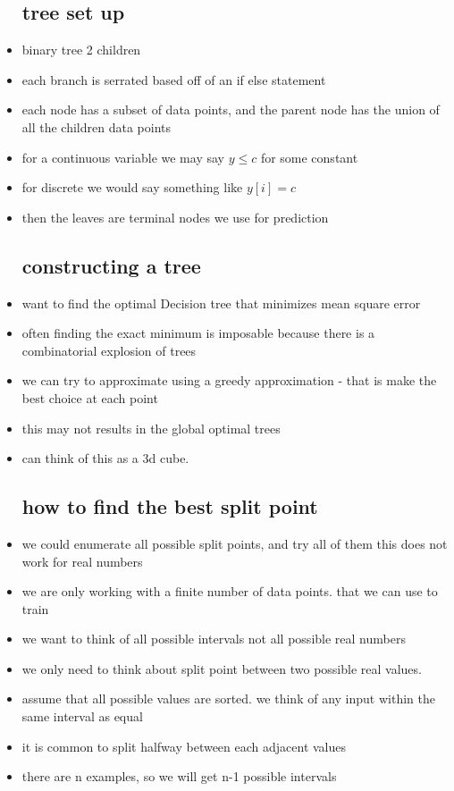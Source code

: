 \documentclass{article}
\begin{document}
\begin{itemize}
\subsection*{tree set up}
\item binary tree 2 children 
\item each branch is serrated based off of an if else statement 
\item each node has a subset of data points, and the parent node has the union of all the children data points 
\item for a continuous variable we may say $y\leq c$ for some constant 
\item for discrete we would say something like $y[i]=c$
\item then the leaves are terminal nodes we use for prediction 
\subsection*{constructing a tree }
\item  want to find the optimal Decision tree that minimizes mean square error 
\item often finding the exact minimum is imposable because there is a combinatorial explosion of trees
\item we can try to approximate using a greedy approximation - that is make the best choice at each point 
\item this may not results in the global optimal trees
\item can think of this as a 3d cube. 
\subsection*{how to find the best split point}
\item we could enumerate all possible split points, and try all of them this does not work for real numbers 
\item we are only working with a finite number of data points. that we can use to train 
\item we want to think of all possible intervals not all possible real numbers 
\item we only need to think about split point between two possible real values. 
\item assume that all possible values are sorted. we think of any input within the same interval as equal 
\item it is common to split halfway between each adjacent values 
\item there are n examples, so we will get n-1 possible intervals

\end{itemize}
\end{document}
